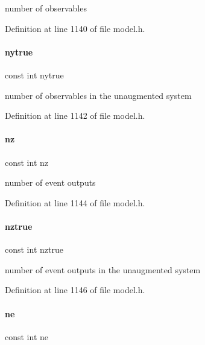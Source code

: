 number of observables 

Definition at line 1140 of file model.\+h.

\mbox{\label{classamici_1_1_model_a54bcfe56ad0df183516d096adf4e0b26}} 
\paragraph{\texorpdfstring{nytrue}{nytrue}}
{\footnotesize\ttfamily const int nytrue}

number of observables in the unaugmented system 

Definition at line 1142 of file model.\+h.

\mbox{\label{classamici_1_1_model_aa406c307f97060d218bc1fe594dfd08f}} 
\paragraph{\texorpdfstring{nz}{nz}}
{\footnotesize\ttfamily const int nz}

number of event outputs 

Definition at line 1144 of file model.\+h.

\mbox{\label{classamici_1_1_model_a9a451378ba5572ef7a3fd4dd89e1c227}} 
\paragraph{\texorpdfstring{nztrue}{nztrue}}
{\footnotesize\ttfamily const int nztrue}

number of event outputs in the unaugmented system 

Definition at line 1146 of file model.\+h.

\mbox{\label{classamici_1_1_model_a07d5274358ec39bfec473cd212a3cb78}} 
\paragraph{\texorpdfstring{ne}{ne}}
{\footnotesize\ttfamily const int ne}

